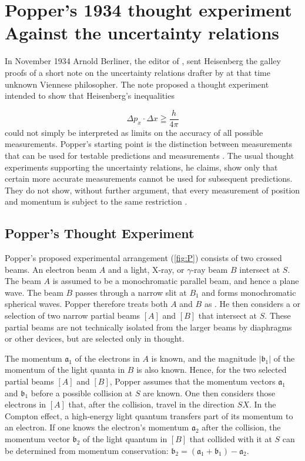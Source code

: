 \documentclass[final,12pt]{article}
\newcommand{\TE}{thought experiment\xspace}
\newcommand{\UR}{uncertainty relations\xspace}
\newcommand{\NW}{\jt{Die Naturwissenschaften}\xspace}
\newcommand{\pos}{\ensuremath{x}\xspace}
\newcommand{\mom}{\ensuremath{p_x}\xspace}
\begin{document}
 \section{Popper's 1934 \TE Against the \UR}
%
In November 1934 Arnold Berliner, the editor of \NW, sent Heisenberg the galley proofs of a short note on the \UR drafter by at that time unknown Viennese philosopher. The note proposed a thought experiment intended to show that Heisenberg's inequalities 

\begin{equation*}
\Delta \mom \cdot \Delta \pos \geqq \frac{h}{4 \pi}
\end{equation*}
%
could not simply be interpreted as limits on the accuracy of all possible measurements. Popper's starting point is the distinction between measurements that can be used for testable predictions and  measurements . The usual thought experiments supporting the uncertainty relations, he claims, show only that certain more accurate measurements cannot be used for subsequent predictions. They do not show, without further argument, that every measurement of position and momentum is subject to the same restriction \citep{Popper1934}.

\subsection{Popper's Thought Experiment}

Popper's proposed experimental arrangement (\cref{fig:P}) consists of two crossed beams. An electron beam $A$ and a light, X-ray, or $\gamma$-ray beam $B$ intersect at $S$. The beam $A$ is assumed to be a monochromatic parallel beam, and hence a plane wave. The beam $B$ passes through a narrow slit at $B_1$ and forms monochromatic spherical waves. Popper therefore treats both $A$ and $B$ as  . He then considers a  or  selection of two narrow partial beams $[A]$ and $[B]$ that intersect at $S$. These partial beams are not technically isolated from the larger beams by diaphragms or other devices, but are selected only in thought.

The momentum $\mathfrak{a}_1$ of the electrons in $A$ is known, and the magnitude $|\mathfrak{b}_1|$ of the momentum of the light quanta in $B$ is also known. Hence, for the two  selected partial beams $[A]$ and $[B]$, Popper assumes that the momentum vectors $\mathfrak{a}_1$ and $\mathfrak{b}_1$ before a possible collision at $S$ are known. One then considers those electrons in $[A]$ that, after the collision, travel in the direction $SX$. In the Compton effect, a high-energy light quantum transfers part of its momentum to an electron. If one knows the electron's momentum $\mathfrak{a}_2$ after the collision, the momentum vector $\mathfrak{b}_2$ of the light quantum in $[B]$ that collided with it at $S$ can be determined from momentum conservation: $\mathfrak{b}_2=(\mathfrak{a}_1+\mathfrak{b}_1)-\mathfrak{a}_2.$
\end{document}

